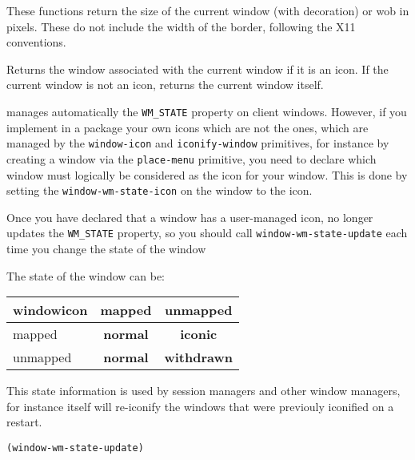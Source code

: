 These functions return the size of the current window (with decoration) or
wob in pixels.  These do not include the width of the border, following the
X11 conventions.

        

Returns the window associated with the current window if it is an icon. If
the current window is not an icon, returns the current window itself.


        

{\GWM} manages automatically the \verb"WM_STATE" property on client windows.
However, if you implement in a {\WOOL} package your own icons which are not
the {\GWM} ones, which are managed by the 
\verb"window-icon" and \verb"iconify-window"
primitives, for instance by creating a window via the \verb"place-menu"
primitive, you need to declare which window must logically be
considered as the icon for your window. This is done by setting the
\verb"window-wm-state-icon" on the window to the icon.

Once you have declared that a window has a user-managed icon, {\GWM} no
longer updates the \verb"WM_STATE" property, so you should call
\verb"window-wm-state-update" each time you change the state of the window

The state of the window can be:

\begin{tabular}{|l|c|c|}
\hline
\vbox{\hbox{window}\hbox{icon}} & mapped & unmapped \\
\hline
mapped & {\bf normal} & {\bf iconic} \\
\hline
unmapped & {\bf normal} & {\bf withdrawn} \\
\hline
\end{tabular}

This state information is used by session managers and other window
managers, for instance {\GWM} itself will re-iconify the windows that were
previouly iconified on a restart.


{\usagefont\begin{verbatim}
(window-wm-state-update)
\end{verbatim}}\usageupspace

